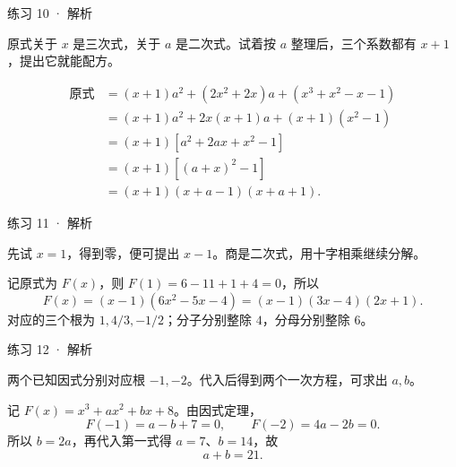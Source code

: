 


\begin{solution}[before skip=4pt plus 1pt,after skip=4pt plus 1pt,top=6pt,bottom=6pt]{练习 10 · 解析}

\think 原式关于 $x$ 是三次式，关于 $a$ 是二次式。试着按 $a$ 整理后，三个系数都有 $x+1$，提出它就能配方。

\solve \begin{align*}
\text{原式}&=(x+1)a^2+(2x^2+2x)a+(x^3+x^2-x-1)\\
&=(x+1)a^2+2x(x+1)a+(x+1)(x^2-1)\\
&=(x+1)[a^2+2ax+x^2-1]\\
&=(x+1)[(a+x)^2-1]\\
&=(x+1)(x+a-1)(x+a+1).
\end{align*}


\end{solution}




\begin{solution}[before skip=4pt plus 1pt,after skip=4pt plus 1pt,top=6pt,bottom=6pt]{练习 11 · 解析}

\think 先试 $x=1$，得到零，便可提出 $x-1$。商是二次式，用十字相乘继续分解。

\solve 记原式为 $F(x)$，则 $F(1)=6-11+1+4=0$，所以
\[F(x)=(x-1)(6x^2-5x-4)=(x-1)(3x-4)(2x+1).\]
对应的三个根为 $1,4/3,-1/2$；分子分别整除 $4$，分母分别整除 $6$。


\end{solution}


\begin{solution}[before skip=4pt plus 1pt,after skip=4pt plus 1pt,top=6pt,bottom=6pt]{练习 12 · 解析}

\think 两个已知因式分别对应根 $-1,-2$。代入后得到两个一次方程，可求出 $a,b$。

\solve 记 $F(x)=x^3+ax^2+bx+8$。由因式定理，
\[F(-1)=a-b+7=0,\qquad F(-2)=4a-2b=0.\]
所以 $b=2a$，再代入第一式得 $a=7$、$b=14$，故
\[a+b=21.\]


\end{solution}

